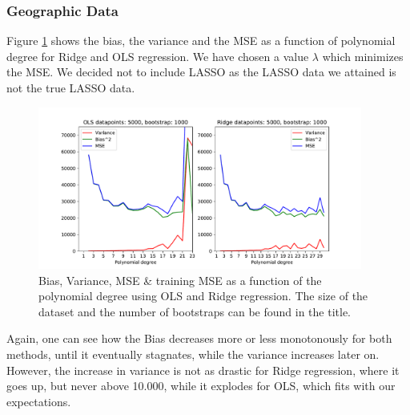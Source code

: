 \documentclass[11pt,a4paper,titlepage]{article}
\begin{document}
\subsubsection{Geographic Data}

Figure \ref{fig:biasVariance_Korea} shows the bias, the variance and the MSE as a function of polynomial degree for Ridge and OLS regression. We have chosen a value $\lambda$ which minimizes the MSE. We decided not to include LASSO as the LASSO data we attained is not the true LASSO data.
\begin{figure}[H]
\centering
\includegraphics[width=0.95\textwidth]{figures/presentable_data/Bias_variance_Korea.pdf}
\caption[Bias, Variance, MSE \& training MSE as a function of the polynomial degree for geodata]{Bias, Variance, MSE \& training MSE as a function of the polynomial degree using OLS and Ridge regression. The size of the dataset and the number of bootstraps can be found in the title.}
\label{fig:biasVariance_Korea}
\end{figure}
 Again, one can see how the Bias decreases more or less monotonously for both methods, until it eventually stagnates, while the variance increases later on. However, the increase in variance is not as drastic for Ridge regression, where it goes up, but never above 10.000, while it explodes for OLS, which fits with our expectations. 
\end{document}
